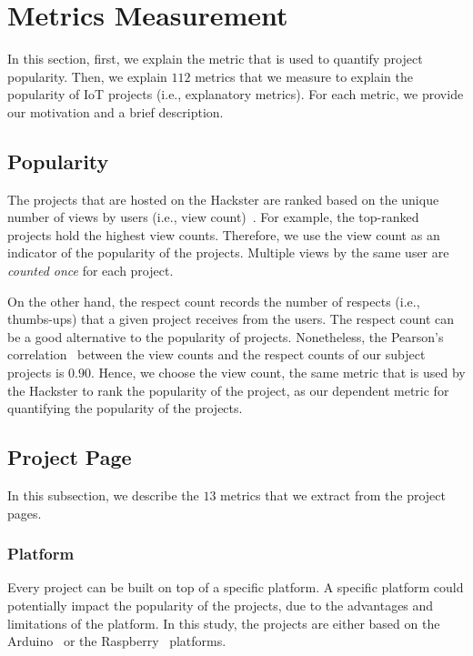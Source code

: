 
\section{Metrics Measurement}\label{sec:measure}

In this section, first, we explain the metric that is used to quantify project popularity.
Then, we explain $112$ metrics that we measure to explain the popularity of IoT projects (i.e., explanatory metrics).
For each metric, we provide our motivation and a brief description.

\subsection{Popularity}

The projects that are hosted on the Hackster are ranked based on the unique number of views by users (i.e., view count)~\cite{hacksterpop}.
For example, the top-ranked projects hold the highest view counts.
Therefore, we use the view count as an indicator of the
popularity of the projects.
Multiple views by the same user are \textit{counted once} for each project.

On the other hand, the respect count records the number of respects (i.e., thumbs-ups) that a given project receives from the users.
The respect count can be a good alternative to the popularity of
projects.
Nonetheless, the Pearson's correlation~\cite{lawrence1989concordance} between the view counts and the respect counts of our subject projects is $0.90$.
Hence, we choose the view count, the same metric that is used by the Hackster to rank the popularity of the project, as our dependent metric for quantifying the popularity of the projects.

\subsection{Project Page}

In this subsection, we describe the $13$ metrics that we extract from the project pages.


\subsubsection*{Platform} Every project can be built on top of a specific platform.
A specific platform could potentially impact the popularity of the projects, due to the advantages and limitations of the platform.
In this study, the projects are either based on the Arduino~\cite{arduino} or the Raspberry~\cite{raspberrypi} platforms.

